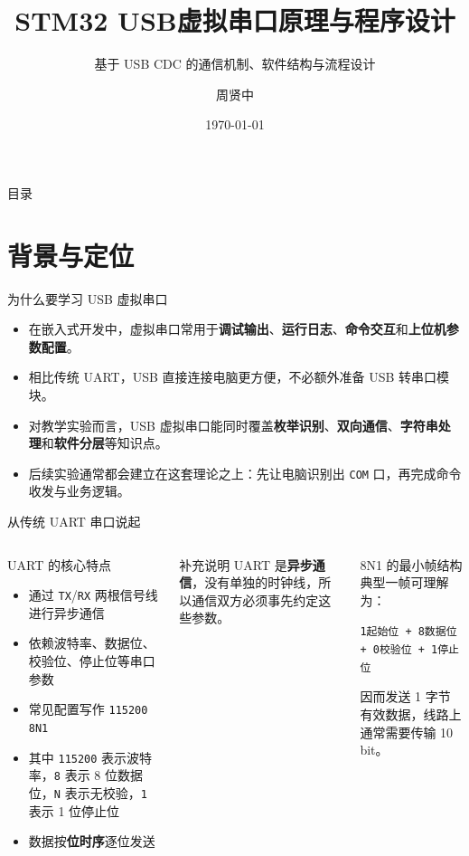 \documentclass[11pt,aspectratio=169]{ctexbeamer}
\title{STM32 USB虚拟串口原理与程序设计}
\subtitle{基于 USB CDC 的通信机制、软件结构与流程设计}
\author{周贤中}
\institute{}
\date{\today}
\newcommand{\code}[1]{\texttt{#1}}
\newcommand{\term}[1]{\textbf{\color{PrimaryBlue}#1}}
\begin{document}
\begin{frame}
  \titlepage
\end{frame}

\begin{frame}{目录}
  \tableofcontents
\end{frame}

\section{背景与定位}

\begin{frame}{为什么要学习 USB 虚拟串口}
  \begin{itemize}
    \item 在嵌入式开发中，虚拟串口常用于\term{调试输出}、\term{运行日志}、\term{命令交互}和\term{上位机参数配置}。
    \item 相比传统 UART，USB 直接连接电脑更方便，不必额外准备 USB 转串口模块。
    \item 对教学实验而言，USB 虚拟串口能同时覆盖\term{枚举识别}、\term{双向通信}、\term{字符串处理}和\term{软件分层}等知识点。
    \item 后续实验通常都会建立在这套理论之上：先让电脑识别出 \code{COM} 口，再完成命令收发与业务逻辑。
  \end{itemize}
\end{frame}

\begin{frame}{从传统 UART 串口说起}
  \small
  \begin{columns}[T,onlytextwidth]
    \begin{block}{UART 的核心特点}
      \begin{itemize}
        \item 通过 \code{TX}/\code{RX} 两根信号线进行异步通信
        \item 依赖波特率、数据位、校验位、停止位等串口参数
        \item 常见配置写作 \code{115200 8N1}
        \item 其中 \code{115200} 表示波特率，\code{8} 表示 8 位数据位，\code{N} 表示无校验，\code{1} 表示 1 位停止位
        \item 数据按\term{位时序}逐位发送
      \end{itemize}
    \end{block}

    \begin{alertblock}{补充说明}
      UART 是\term{异步通信}，没有单独的时钟线，所以通信双方必须事先约定这些参数。
    \end{alertblock}

    \begin{block}{8N1 的最小帧结构}
      典型一帧可理解为：
      \begin{center}
        \code{1起始位 + 8数据位 + 0校验位 + 1停止位}
      \end{center}
      因而发送 1 字节有效数据，线路上通常需要传输 10 bit。
    \end{block}
  \end{columns}
\end{frame}
\end{document}
